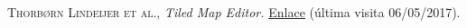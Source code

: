 \begin{thebibliography}{aaaa}
 \textsc{Thorbørn Lindeijer et al.},
\textit{Tiled Map Editor.} \href{http://www.mapeditor.org/}{\color{blue}\underline{Enlace}} (última visita 06/05/2017).
\end{thebibliography}
